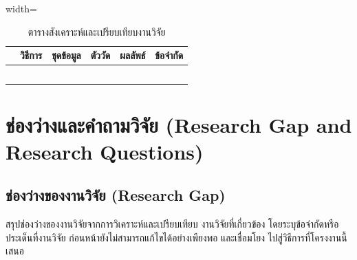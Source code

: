 \documentclass[20pt,a4paper]{article}
\begin{document}
\begin{table}[H]
\centering
\caption{ตารางสังเคราะห์และเปรียบเทียบงานวิจัย}
\label{tab:synthesis_matrix}

\begin{adjustbox}{width=\textwidth}
\footnotesize

\begin{tabular}{|
>{\centering\arraybackslash}p{1.0cm}|
p{2.5cm}|
p{2.5cm}|
p{2.3cm}|
p{2.5cm}|
p{3.0cm}|}
\hline

\multicolumn{1}{|c|}{\textbf{งานวิจัย}} &
\multicolumn{1}{c|}{\textbf{วิธีการ}} &
\multicolumn{1}{c|}{\textbf{ชุดข้อมูล}} &
\multicolumn{1}{c|}{\textbf{ตัววัด}} &
\multicolumn{1}{c|}{\textbf{ผลลัพธ์}} &
\multicolumn{1}{c|}{\textbf{ข้อจำกัด}}
\\
\hline

\cite{musikawan2022enhanced} &
\dotfill &
\dotfill &
\dotfill &
\dotfill &
\dotfill
\\
\hline

\cite{kongsorot2023intrusion} &
\dotfill &
\dotfill &
\dotfill &
\dotfill &
\dotfill
\\
\hline

\dotfill &
\dotfill &
\dotfill &
\dotfill &
\dotfill &
\dotfill
\\
\hline

\dotfill &
\dotfill &
\dotfill &
\dotfill &
\dotfill &
\dotfill
\\
\hline

\dotfill &
\dotfill &
\dotfill &
\dotfill &
\dotfill &
\dotfill
\\
\hline

\end{tabular}

\end{adjustbox}
\end{table}


\section{ช่องว่างและคำถามวิจัย
(Research Gap and Research Questions)}

\subsection{ช่องว่างของงานวิจัย (Research Gap)}

สรุปช่องว่างของงานวิจัยจากการวิเคราะห์และเปรียบเทียบ
งานวิจัยที่เกี่ยวข้อง โดยระบุข้อจำกัดหรือประเด็นที่งานวิจัย
ก่อนหน้ายังไม่สามารถแก้ไขได้อย่างเพียงพอ และเชื่อมโยง
ไปสู่วิธีการที่โครงงานนี้เสนอ
\end{document}
